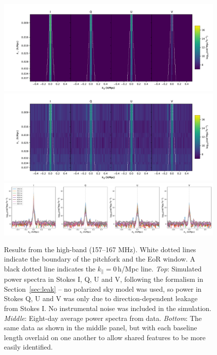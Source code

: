 \documentclass[twocolumn, trackchanges]{aastex61}
\begin{document}
\begin{figure}[h]
\centering
\includegraphics[scale=0.45]{timeavg_SIM_high.pdf}
\includegraphics[scale=0.45]{timeavg_high.pdf}
\includegraphics[scale=0.35]{timeavg_1d_high.pdf}
\caption{Results from the high-band (157--167 MHz). White dotted lines indicate the boundary of the pitchfork and the EoR window. A black dotted line indicates the $k_{\parallel}=0$\,h/Mpc line. \textit{Top}: Simulated power spectra in Stokes I, Q, U and V, following the formalism in Section~\ref{sec:leak} -- no polarized sky model was used, so power in Stokes Q, U and V was only due to direction-dependent leakage from Stokes I. No instrumental noise was included in the simulation. \textit{Middle}: Eight-day average power spectra from data. \textit{Bottom}: The same data as shown in the middle panel, but with each baseline length overlaid on one another to allow shared features to be more easily identified.}
\label{fig:pitchforks_highband}
\end{figure}
\end{document}
